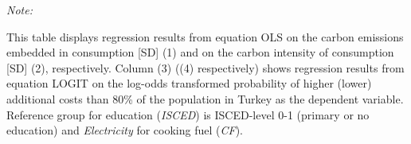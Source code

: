 \begin{table}[htbp!]
\begin{adjustbox}{width = 1\textwidth, max height = 0.95\textheight, center}
\begin{threeparttable}[b]
         \begin{tablenotes}\item \medskip \textit{Note:}
            \item This table displays regression results from equation OLS on the carbon emissions embedded in consumption [SD] (1) and on the carbon intensity of consumption [SD] (2), respectively. 
                                      Column (3) ((4) respectively) shows regression results from equation LOGIT on the log-odds transformed probability of higher (lower) additional costs than 80\% of the population in Turkey as the dependent variable. Reference group for education (\textit{ISCED}) is ISCED-level 0-1 (primary or no education) and \textit{Electricity} for cooking fuel (\textit{CF}).
         \end{tablenotes}
      \end{threeparttable}
   \end{adjustbox}
\end{table}


